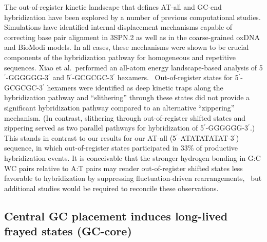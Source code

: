\documentclass[journal=jpcbfk,manuscript=article]{achemso}
\begin{document}
The out-of-register kinetic landscape that defines AT-all and GC-end hybridization have been explored by a number of previous computational studies. Simulations have identified internal displacement mechanisms capable of correcting base pair alignment in 3SPN.2 \citep{Hinckley2014Coarse-grainedEffects} as well as in the coarse-grained oxDNA \citep{Romano2013DNADependence} and BioModi \citep{Markegard2015} models. In all cases, these mechanisms were shown to be crucial components of the hybridization pathway for homogeneous and repetitive sequences. Xiao et al.\ performed an all-atom energy landscape-based analysis of 5$^\prime$-GGGGGG-3$^\prime$ and 5$^\prime$-GCGCGC-3$^\prime$ hexamers.~\citep{Xiao2019} Out-of-register states for 5$^\prime$-GCGCGC-3$^\prime$ hexamers were identified as deep kinetic traps along the hybridization pathway and ``slithering'' through these states did not provide a significant hybridization pathway compared to an alternative ``zippering'' mechanism. (In contrast, slithering through out-of-register shifted states and zippering served as two parallel pathways for hybridization of 5$^\prime$-GGGGGG-3$^\prime$.) This stands in contrast to our results for our AT-all (5$^\prime$-ATATATATAT-3$^\prime$) sequence, in which out-of-register states participated in 33\% of productive hybridization events. It is conceivable that the stronger hydrogen bonding in G:C WC pairs relative to A:T pairs may render out-of-register shifted states less favorable to hybridization by suppressing fluctuation-driven rearrangements,~\citep{Yakovchuk2006Base-stackingHelix,Zacharias2020Base-PairingFormation} but additional studies would be required to reconcile these observations.





\subsection{Central GC placement induces long-lived frayed states (GC-core)} \label{sec:GC-core}
\end{document}
